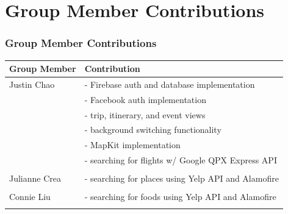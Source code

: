\documentclass{beamer}
\begin{document}
\section{Group Member Contributions}
\begin{frame}
\frametitle{Group Member Contributions}
    \begin{tabular}{l|l}
        Group Member & Contribution \\
        \hline
        Justin Chao & - Firebase auth and database implementation \\
         & - Facebook auth implementation \\
         & - trip, itinerary, and event views \\
         & - background switching functionality \\
         & - MapKit implementation \\
         & - searching for flights w/ Google QPX Express API \\
         &  \\

        Julianne Crea & - searching for places using Yelp API and Alamofire \\ 
         &  \\
         
        Connie Liu & - searching for foods using Yelp API and Alamofire \\
         &  \\
    \end{tabular}
\end{frame}
\end{document}
